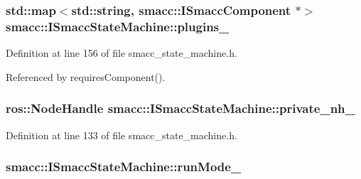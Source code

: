 \subsubsection[{\texorpdfstring{plugins\+\_\+}{plugins_}}]{\setlength{\rightskip}{0pt plus 5cm}std\+::map$<$std\+::string, {\bf smacc\+::\+I\+Smacc\+Component} $\ast$$>$ smacc\+::\+I\+Smacc\+State\+Machine\+::plugins\+\_\+\hspace{0.3cm}{\ttfamily [private]}}\hypertarget{classsmacc_1_1ISmaccStateMachine_a7f07e884dfad5ff7182230290cb337b8}{}\label{classsmacc_1_1ISmaccStateMachine_a7f07e884dfad5ff7182230290cb337b8}


Definition at line 156 of file smacc\+\_\+state\+\_\+machine.\+h.



Referenced by requires\+Component().

\subsubsection[{\texorpdfstring{private\+\_\+nh\+\_\+}{private_nh_}}]{\setlength{\rightskip}{0pt plus 5cm}ros\+::\+Node\+Handle smacc\+::\+I\+Smacc\+State\+Machine\+::private\+\_\+nh\+\_\+\hspace{0.3cm}{\ttfamily [protected]}}\hypertarget{classsmacc_1_1ISmaccStateMachine_a9c6a5c647ecca6599589c12fdcd53bfc}{}\label{classsmacc_1_1ISmaccStateMachine_a9c6a5c647ecca6599589c12fdcd53bfc}


Definition at line 133 of file smacc\+\_\+state\+\_\+machine.\+h.

\subsubsection[{\texorpdfstring{run\+Mode\+\_\+}{runMode_}}]{ smacc\+::\+I\+Smacc\+State\+Machine\+::run\+Mode\+\_\+\hspace{0.3cm}{\ttfamily [private]}}\hypertarget{classsmacc_1_1ISmaccStateMachine_a9f8cfbf577f7ae7a48b7a328e2e6b589}{}\label{classsmacc_1_1ISmaccStateMachine_a9f8cfbf577f7ae7a48b7a328e2e6b589}


